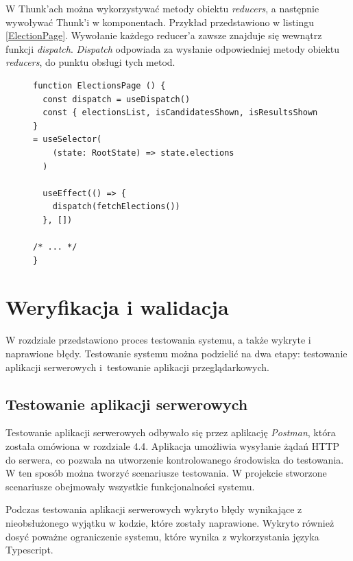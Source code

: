 \documentclass[a4paper,12pt]{book}
\begin{document}
W Thunk'ach można wykorzystywać metody obiektu \textit{reducers}, a następnie wywoływać Thunk'i w komponentach. Przykład przedstawiono w listingu \ref{ElectionPage}. Wywołanie każdego reducer'a zawsze znajduje się wewnątrz funkcji \textit{dispatch}. \textit{Dispatch} odpowiada za wysłanie odpowiedniej metody obiektu \textit{reducers}, do punktu obsługi tych metod.

\begin{figure}
\centering
\begin{lstlisting}[style=ES6, caption={Wykorzystanie Thunk'a, w komponencie \textit{ElectionsPage}.}, label={ElectionPage}]
function ElectionsPage () {
  const dispatch = useDispatch()
  const { electionsList, isCandidatesShown, isResultsShown } 
= useSelector(
    (state: RootState) => state.elections
  )

  useEffect(() => {
    dispatch(fetchElections())
  }, [])

/* ... */
}
\end{lstlisting}
\end{figure}

\chapter{Weryfikacja i walidacja}

W rozdziale przedstawiono proces testowania systemu, a także wykryte i naprawione błędy. Testowanie systemu można podzielić na dwa etapy: testowanie aplikacji serwerowych i~testowanie aplikacji przeglądarkowych. 

\section{Testowanie aplikacji serwerowych}

Testowanie aplikacji serwerowych odbywało się przez aplikację \textit{Postman}, która została omówiona w rozdziale 4.4. Aplikacja umożliwia wysyłanie żądań HTTP do serwera, co pozwala na utworzenie kontrolowanego środowiska do testowania. W ten sposób można tworzyć scenariusze testowania. W projekcie stworzone scenariusze obejmowały wszystkie funkcjonalności systemu.
 
Podczas testowania aplikacji serwerowych wykryto błędy wynikające z nieobsłużonego wyjątku w kodzie, które zostały naprawione. Wykryto również dosyć poważne ograniczenie systemu, które wynika z wykorzystania języka Typescript.
 
\end{document}
